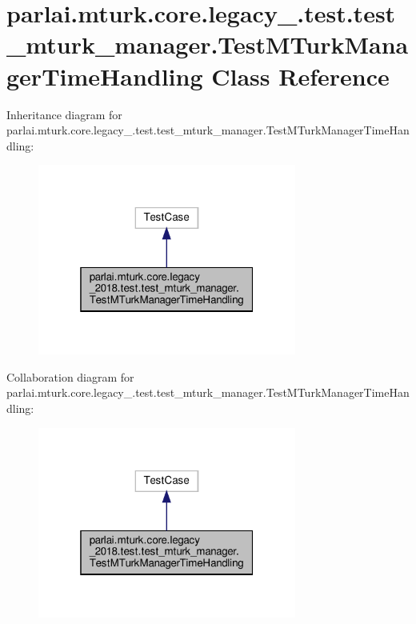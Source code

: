 \hypertarget{classparlai_1_1mturk_1_1core_1_1legacy__2018_1_1test_1_1test__mturk__manager_1_1TestMTurkManagerTimeHandling}{}\section{parlai.\+mturk.\+core.\+legacy\+\_.\+test.\+test\+\_\+mturk\+\_\+manager.\+Test\+M\+Turk\+Manager\+Time\+Handling Class Reference}
\label{classparlai_1_1mturk_1_1core_1_1legacy__2018_1_1test_1_1test__mturk__manager_1_1TestMTurkManagerTimeHandling}


Inheritance diagram for parlai.\+mturk.\+core.\+legacy\+\_.\+test.\+test\+\_\+mturk\+\_\+manager.\+Test\+M\+Turk\+Manager\+Time\+Handling\+:
\nopagebreak
\begin{figure}[H]
\begin{center}
\leavevmode
\includegraphics[width=241pt]{d3/d06/classparlai_1_1mturk_1_1core_1_1legacy__2018_1_1test_1_1test__mturk__manager_1_1TestMTurkManagerTimeHandling__inherit__graph}
\end{center}
\end{figure}


Collaboration diagram for parlai.\+mturk.\+core.\+legacy\+\_.\+test.\+test\+\_\+mturk\+\_\+manager.\+Test\+M\+Turk\+Manager\+Time\+Handling\+:
\nopagebreak
\begin{figure}[H]
\begin{center}
\leavevmode
\includegraphics[width=241pt]{db/d1a/classparlai_1_1mturk_1_1core_1_1legacy__2018_1_1test_1_1test__mturk__manager_1_1TestMTurkManagerTimeHandling__coll__graph}
\end{center}
\end{figure}

